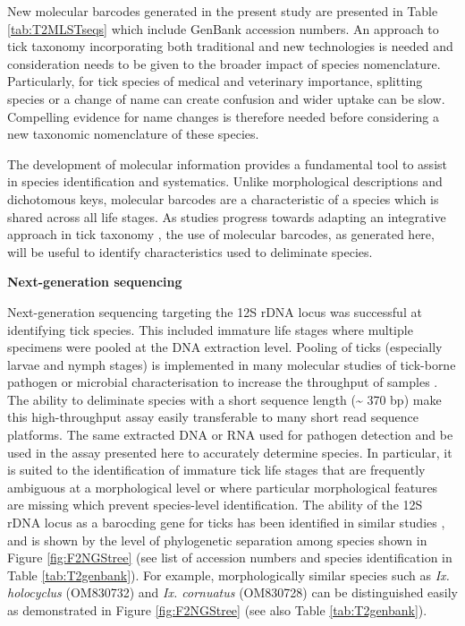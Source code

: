 \documentclass[a4paper, nobind]{templates/ociamthesis}
\begin{document}
New molecular barcodes generated in the present study are presented in Table \ref{tab:T2MLSTseqs} which include GenBank accession numbers.
An approach to tick taxonomy incorporating both traditional and new technologies is needed and consideration needs to be given to the broader impact of species nomenclature.
Particularly, for tick species of medical and veterinary importance, splitting species or a change of name can create confusion and wider uptake can be slow.
Compelling evidence for name changes is therefore needed before considering a new taxonomic nomenclature of these species.

The development of molecular information provides a fundamental tool to assist in species identification and systematics.
Unlike morphological descriptions and dichotomous keys, molecular barcodes are a characteristic of a species which is shared across all life stages.
As studies progress towards adapting an integrative approach in tick taxonomy \autocite{dantas-torresSpeciesConceptsWhat2018}, the use of molecular barcodes, as generated here, will be useful to identify characteristics used to deliminate species.

\textbf{Next-generation sequencing}

Next-generation sequencing targeting the 12S rDNA locus was successful at identifying tick species.
This included immature life stages where multiple specimens were pooled at the DNA extraction level.
Pooling of ticks (especially larvae and nymph stages) is implemented in many molecular studies of tick-borne pathogen or microbial characterisation to increase the throughput of samples \autocite{estrada-penaPitfallsTickTickBorne2021}.
The ability to deliminate species with a short sequence length (\textasciitilde{} 370 bp) make this high-throughput assay easily transferable to many short read sequence platforms.
The same extracted DNA or RNA used for pathogen detection and be used in the assay presented here to accurately determine species.
In particular, it is suited to the identification of immature tick life stages that are frequently ambiguous at a morphological level or where particular morphological features are missing which prevent species-level identification.
The ability of the 12S rDNA locus as a barocding gene for ticks has been identified in similar studies \autocite{lvAssessmentFourDNA2014,kandumaMitochondrialNuclearMultilocus2019}, and is shown by the level of phylogenetic separation among species shown in Figure \ref{fig:F2NGStree} (see list of accession numbers and species identification in Table \ref{tab:T2genbank}).
For example, morphologically similar species such as \emph{Ix. holocyclus} (OM830732) and \emph{Ix. cornuatus} (OM830728) can be distinguished easily as demonstrated in Figure \ref{fig:F2NGStree} (see also Table \ref{tab:T2genbank}).
\end{document}
